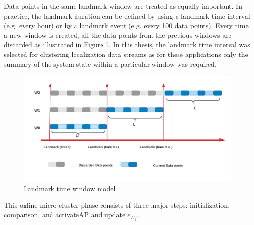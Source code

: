 \documentclass[../UNBThesis2.tex]{subfiles}
\begin{document}
Data points in the same landmark window are treated as equally important. In practice, the landmark duration can be defined by using a landmark time interval (e.g. every hour) or by a landmark event (e.g. every 100 data points). Every time a new window is created, all the data points from the previous windows are discarded as illustrated in Figure \ref{land}. In this thesis, the landmark time interval was selected for clustering localization data streams as for these applications only the summary of the system state within a particular window was required. 



   \begin{figure}[!h]
    \centering
    \includegraphics[width = 11 cm]{image/LANDMARK-2.png}
    \caption{Landmark time window model }
    \label{land}
    \end{figure}
 
This online micro-cluster phase consists of three major steps: initialization, comparison, and activateAP and update $\epsilon_{W_j}$. %


\end{document}
